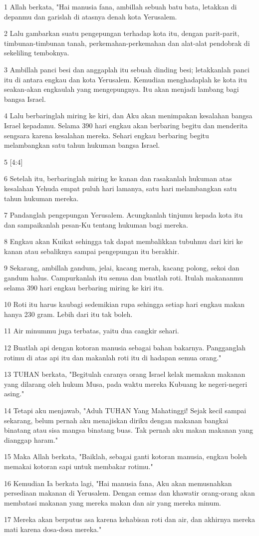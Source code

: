 \par 1 Allah berkata, "Hai manusia fana, ambillah sebuah batu bata, letakkan di depanmu dan garislah di atasnya denah kota Yerusalem.
\par 2 Lalu gambarkan suatu pengepungan terhadap kota itu, dengan parit-parit, timbunan-timbunan tanah, perkemahan-perkemahan dan alat-alat pendobrak di sekeliling temboknya.
\par 3 Ambillah panci besi dan anggaplah itu sebuah dinding besi; letakkanlah panci itu di antara engkau dan kota Yerusalem. Kemudian menghadaplah ke kota itu seakan-akan engkaulah yang mengepungnya. Itu akan menjadi lambang bagi bangsa Israel.
\par 4 Lalu berbaringlah miring ke kiri, dan Aku akan menimpakan kesalahan bangsa Israel kepadamu. Selama 390 hari engkau akan berbaring begitu dan menderita sengsara karena kesalahan mereka. Sehari engkau berbaring begitu melambangkan satu tahun hukuman bangsa Israel.
\par 5 [4:4]
\par 6 Setelah itu, berbaringlah miring ke kanan dan rasakanlah hukuman atas kesalahan Yehuda empat puluh hari lamanya, satu hari melambangkan satu tahun hukuman mereka.
\par 7 Pandanglah pengepungan Yerusalem. Acungkanlah tinjumu kepada kota itu dan sampaikanlah pesan-Ku tentang hukuman bagi mereka.
\par 8 Engkau akan Kuikat sehingga tak dapat membalikkan tubuhmu dari kiri ke kanan atau sebaliknya sampai pengepungan itu berakhir.
\par 9 Sekarang, ambillah gandum, jelai, kacang merah, kacang polong, sekoi dan gandum halus. Campurkanlah itu semua dan buatlah roti. Itulah makananmu selama 390 hari engkau berbaring miring ke kiri itu.
\par 10 Roti itu harus kaubagi sedemikian rupa sehingga setiap hari engkau makan hanya 230 gram. Lebih dari itu tak boleh.
\par 11 Air minummu juga terbatas, yaitu dua cangkir sehari.
\par 12 Buatlah api dengan kotoran manusia sebagai bahan bakarnya. Pangganglah rotimu di atas api itu dan makanlah roti itu di hadapan semua orang."
\par 13 TUHAN berkata, "Begitulah caranya orang Israel kelak memakan makanan yang dilarang oleh hukum Musa, pada waktu mereka Kubuang ke negeri-negeri asing."
\par 14 Tetapi aku menjawab, "Aduh TUHAN Yang Mahatinggi! Sejak kecil sampai sekarang, belum pernah aku menajiskan diriku dengan makanan bangkai binatang atau sisa mangsa binatang buas. Tak pernah aku makan makanan yang dianggap haram."
\par 15 Maka Allah berkata, "Baiklah, sebagai ganti kotoran manusia, engkau boleh memakai kotoran sapi untuk membakar rotimu."
\par 16 Kemudian Ia berkata lagi, "Hai manusia fana, Aku akan memusnahkan persediaan makanan di Yerusalem. Dengan cemas dan khawatir orang-orang akan membatasi makanan yang mereka makan dan air yang mereka minum.
\par 17 Mereka akan berputus asa karena kehabisan roti dan air, dan akhirnya mereka mati karena dosa-dosa mereka."

